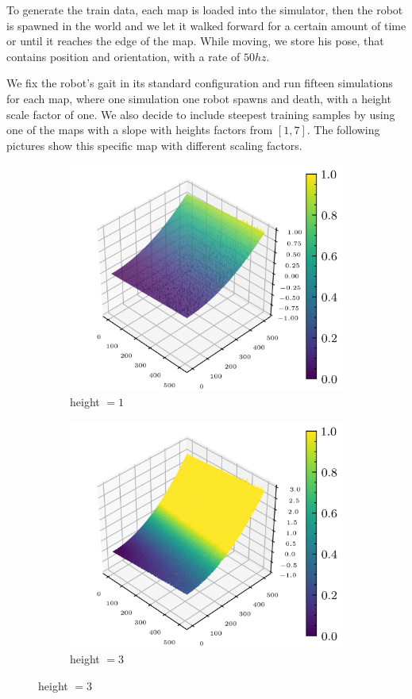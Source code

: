 \documentclass[../document.tex]{subfiles}
\begin{document}
To generate the train data, each map is loaded into the simulator, then the robot is spawned in the world and we let it walked forward for a certain amount of time or until it reaches the edge of the map. While moving, we store his pose, that contains position and orientation, with a rate of $50hz$. 

We fix the robot's gait in its standard configuration and run fifteen simulations for each map, where one simulation one robot spawns and death, with a height scale factor of one. We also decide to include steepest training samples by using one of the maps with a slope with heights factors from $[1,7]$. The following pictures show this specific map with different scaling factors. 

\begin{figure}[H]
    	\begin{subfigure}[b]{0.5\textwidth}
			\includegraphics[width=\textwidth]{img/hm3d/slope_rocks2.png}
			\caption{height $=1$}
	    \end{subfigure}
		\begin{subfigure}[b]{0.5\textwidth}
			\includegraphics[width=\textwidth]{img/hm3d/3-slope_rocks2.png}
			\caption{height $=3$}
	    \end{subfigure}	
	   

\end{figure}
\end{document}
